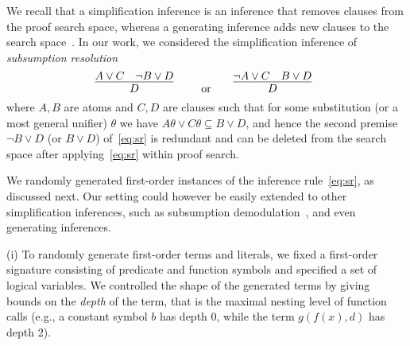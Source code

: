 We recall that a simplification inference is an inference
that removes clauses from the proof search space, whereas a generating
inference adds new clauses to the search space~\cite{Vampire13}. In our work, we
considered the simplification inference of 
\emph{subsumption resolution} 
\begin{equation}\label{eq:sr}
    \infer[]{
      D
      }{
      A\vee C
      &
      {\neg B \vee D}
    }
    \qquad \text{or}\qquad
    \infer[]{
      D
      }{
      \neg A\vee C
      &
      {B \vee D}
    }
      \end{equation}
      where $A,B$ are atoms and $C,D$ are clauses
      such that for some substitution (or a most general unifier) $\theta$ we have $A\theta\vee
C\theta\subseteq B\vee D$, and hence the second premise $\neg B \vee
D$ (or $B \vee
D$) of~\eqref{eq:sr} is redundant and can  be deleted from the search
space after applying~\eqref{eq:sr} within proof search.

We randomly generated first-order instances of the inference rule~\eqref{eq:sr}, as
discussed next. Our setting could however be easily extended to other
simplification inferences, such as subsumption demodulation~\cite{Rath20},
and even generating inferences.

\noindent (i) To randomly generate first-order terms and literals,
we fixed a first-order signature consisting of %
predicate and function symbols and specified a set of logical
variables. 
We controlled the shape of the generated terms
by giving bounds on the \emph{depth} of the term,
that is the maximal nesting level of function calls
(e.g., a constant symbol $b$ has depth 0, while the term $g(f(x),d)$ has depth 2).\smallskip


